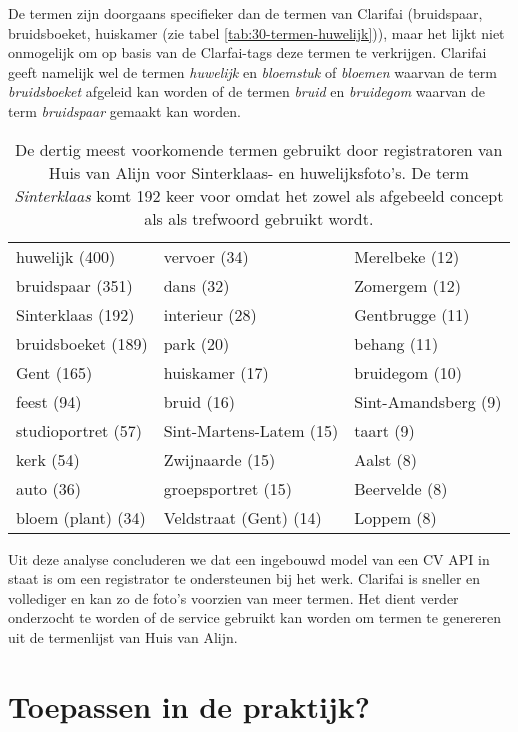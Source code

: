 De termen zijn doorgaans specifieker dan de termen van Clarifai (bruidspaar, bruidsboeket, huiskamer (zie tabel \ref{tab:30-termen-huwelijk})), maar het lijkt niet onmogelijk om op basis van de Clarfai-tags deze termen te verkrijgen. Clarifai geeft namelijk wel de termen \textit{huwelijk} en \textit{bloemstuk} of \textit{bloemen} waarvan de term \textit{bruidsboeket} afgeleid kan worden of de termen \textit{bruid} en \textit{bruidegom} waarvan de term \textit{bruidspaar} gemaakt kan worden.

\begin{table}
	\centering
	\begin{tabular}{*{3}{l}}
		huwelijk (400) & vervoer (34) & Merelbeke (12) \\
		bruidspaar (351) & dans (32) & Zomergem (12) \\
		Sinterklaas (192) & interieur (28) & Gentbrugge (11) \\
		bruidsboeket (189) & park (20) & behang (11) \\
		Gent (165) & huiskamer (17) & bruidegom (10) \\
		feest (94) & bruid (16) & Sint-Amandsberg (9) \\
		studioportret (57) & Sint-Martens-Latem (15) & taart (9) \\
		kerk (54) & Zwijnaarde (15) & Aalst (8) \\
		auto (36) & groepsportret (15) & Beervelde (8) \\
		bloem (plant) (34) & Veldstraat (Gent) (14) & Loppem (8) \\
	\end{tabular}
	\caption[De dertig meest voorkomende termen gebruikt door registratoren van Huis van Alijn]{De dertig meest voorkomende termen gebruikt door registratoren van Huis van Alijn voor Sinterklaas- en huwelijksfoto's. De term \textit{Sinterklaas} komt 192 keer voor omdat het zowel als afgebeeld concept als als trefwoord gebruikt wordt.}
	\label{tab:30-termen-HvA}
\end{table}

Uit deze analyse concluderen we dat een ingebouwd model van een CV API in staat is om een registrator te ondersteunen bij het werk. Clarifai is sneller en vollediger en kan zo de foto's voorzien van meer termen. Het dient verder onderzocht te worden of de service gebruikt kan worden om termen te genereren uit de termenlijst van Huis van Alijn.

\section{Toepassen in de praktijk?}
\label{sec:ingebouwd-toepassen-praktijk}

